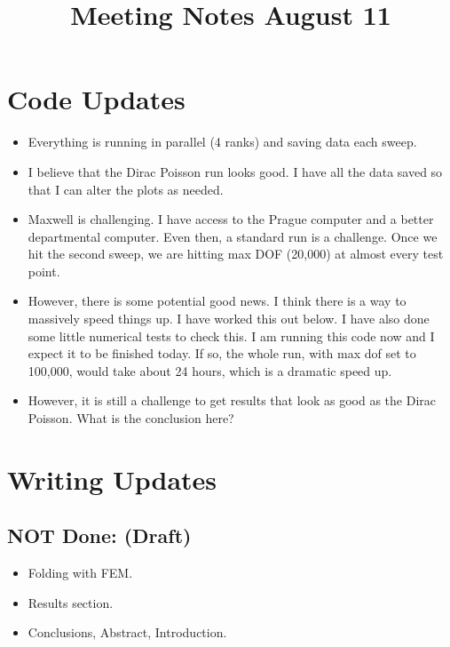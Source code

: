 \documentclass[12pt,a4paper]{article}
\title{Meeting Notes August 11}
\author{}
\date{}
\begin{document}
\maketitle


\section{Code Updates}

\begin{itemize}
\item Everything is running in parallel (4 ranks) and saving data each sweep. 
\item I believe that the Dirac Poisson run looks good. I have all the data saved so that I can alter the plots as needed.
\item Maxwell is challenging. I have access to the Prague computer and a better departmental computer. Even then, a standard run is a challenge. Once we hit the second sweep, we are hitting max DOF (20,000) at almost every test point. 
\item However, there is some potential good news. I think there is a way to massively speed things up. I have worked this out below. I have also done some little numerical tests to check this. I am running this code now and I expect it to be finished today. If so, the whole run, with max dof set to 100,000, would take about 24 hours, which is a dramatic speed up.
\item However, it is still a challenge to get results that look as good as the Dirac Poisson. What is the conclusion here? 
\end{itemize}



\section{Writing Updates}

\subsection{NOT Done: (Draft)}
\begin{itemize}
    \item Folding with FEM.
    \item Results section.
    \item Conclusions, Abstract, Introduction.
\end{itemize}
\end{document}
